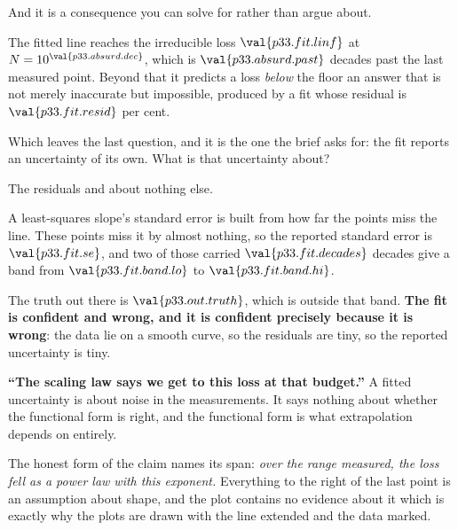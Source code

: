 \begin{fr}
And it is a consequence you can solve for rather than argue about.

The fitted line reaches the irreducible loss $\val{p33.fit.linf}$ at
$N = 10^{\val{p33.absurd.dec}}$, which is
$\val{p33.absurd.past}$ decades past the last measured point. Beyond that it
predicts a loss \emph{below} the floor \dash{} an answer that is not merely
inaccurate but impossible, produced by a fit whose residual is
$\val{p33.fit.resid}$ per cent.
\end{fr}


\begin{fr}
Which leaves the last question, and it is the one the brief asks for: the fit
reports an uncertainty of its own. What is that uncertainty about?
\dotline
\nextframe
\end{fr}

\begin{fr}
\begin{ansblock}
The residuals \dash{} and about nothing else.

A least-squares slope's standard error is built from how far the points miss
the line. These points miss it by almost nothing, so the reported standard
error is $\val{p33.fit.se}$, and two of those carried
$\val{p33.fit.decades}$ decades give a band from $\val{p33.fit.band.lo}$ to
$\val{p33.fit.band.hi}$.
\end{ansblock}

The truth out there is $\val{p33.out.truth}$, which is outside that band.
\textbf{The fit is confident and wrong, and it is confident precisely because
it is wrong}: the data lie on a smooth curve, so the residuals are tiny, so
the reported uncertainty is tiny.
\end{fr}

\begin{fr}
\begin{trapbox}
\textbf{\enquote{The scaling law says we get to this loss at that budget.}}
A fitted uncertainty is about noise in the measurements. It says nothing
about whether the functional form is right, and the functional form is what
extrapolation depends on entirely.

The honest form of the claim names its span: \emph{over the range measured,
the loss fell as a power law with this exponent.} Everything to the right of
the last point is an assumption about shape, and the plot contains no
evidence about it \dash{} which is exactly why the plots are drawn with the
line extended and the data marked.
\end{trapbox}
\end{fr}

